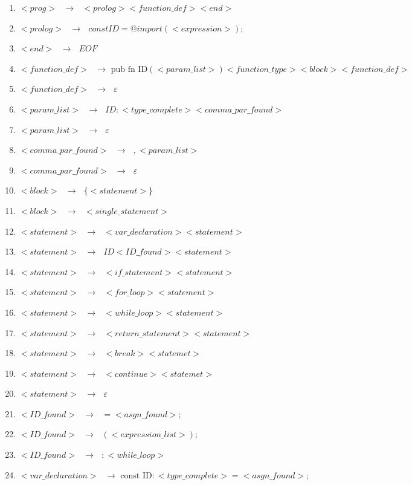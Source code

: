 \documentclass[12pt]{article}
\begin{document}
\begin{enumerate}
\item $<prog>\text{ }\to \text{ }<prolog> <function\_def> <end>$
\item $<prolog> \text{ }\to \text{ } const ID = @import ( <expression> ) ;$
\item $<end> \text{ }\to \text{ } EOF$
\item $<function\_def> \text{ }\to \text{ pub fn ID}  (<param\_list>) <function\_type> <block> <function\_def>$
\item $<function\_def> \text{ }\to \text{ } \varepsilon$
\item $<param\_list> \text{ }\to \text{ } ID : <type\_complete> <comma\_par\_found>$
\item $<param\_list> \text{ }\to \text{ } \varepsilon$
\item $<comma\_par\_found> \text{ }\to \text{ } , <param\_list>$
\item $<comma\_par\_found> \text{ }\to \text{ } \varepsilon$
\item $<block> \text{ }\to \text{ } \{ <statement> \}$
\item $<block> \text{ }\to \text{ } <single\_statement>$
\item $<statement> \text{ }\to \text{ } <var\_declaration> <statement>$
\item $<statement> \text{ }\to \text{ } ID <ID\_found> <statement>$
\item $<statement> \text{ }\to \text{ } <if\_statement> <statement>$
\item $<statement> \text{ }\to \text{ } <for\_loop> <statement>$
\item $<statement> \text{ }\to \text{ } <while\_loop> <statement> $
\item $<statement> \text{ }\to \text{ } <return\_statement> <statement>$
\item $<statement> \text{ }\to \text{ } <break> <statemet>$
\item $<statement> \text{ }\to \text{ } <continue> <statemet>$
\item $<statement> \text{ }\to \text{ } \varepsilon$
\item $<ID\_found> \text{ }\to \text{ } = <asgn\_found> ;$
\item $<ID\_found> \text{ }\to \text{ } ( <expression\_list> );$
\item $<ID\_found> \text{ }\to \text{ } : <while\_loop>$
\item $<var\_declaration> \text{ }\to \text{ const ID} : <type\_complete> = <asgn\_found> ;$

\end{enumerate}
\end{document}
